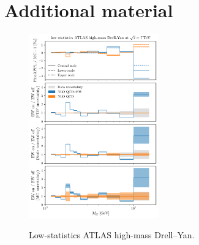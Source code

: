 \section{Additional material}
\label{app:add_plots}

\begin{figure}
    \centering
    \includegraphics[width=0.5\textwidth]{figures/pineappl_ATLASZHIGHMASS49FB_lowstat}\\
    \caption{Low-statistics ATLAS high-mass Drell--Yan.}
    \label{fig:atlaszhighmass49fb-lowstat}
\end{figure}

